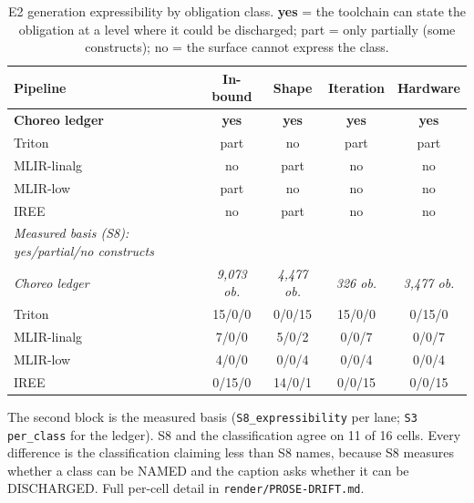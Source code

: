 \begin{table}[t]
\centering\footnotesize
\caption{E2 generation expressibility by obligation class. \textbf{yes} = the toolchain can state the obligation at a level where it could be discharged; part = only partially (some constructs); no = the surface cannot express the class.}
\label{tab:e2-generation}
\begin{tabular}{@{}lcccc@{}}
\toprule
Pipeline & In-bound & Shape & Iteration & Hardware \\
\midrule
\textbf{Choreo ledger} & \textbf{yes} & \textbf{yes} & \textbf{yes} & \textbf{yes} \\
Triton & part & no & part & part \\
MLIR-linalg & no & part & no & no \\
MLIR-low & part & no & no & no \\
IREE & no & part & no & no \\
\midrule
\textit{Measured basis (S8): yes/partial/no constructs} &  &  &  &  \\
\textit{Choreo ledger} & \textit{9,073 ob.} & \textit{4,477 ob.} & \textit{326 ob.} & \textit{3,477 ob.} \\
Triton & 15/0/0 & 0/0/15 & 15/0/0 & 0/15/0 \\
MLIR-linalg & 7/0/0 & 5/0/2 & 0/0/7 & 0/0/7 \\
MLIR-low & 4/0/0 & 0/0/4 & 0/0/4 & 0/0/4 \\
IREE & 0/15/0 & 14/0/1 & 0/0/15 & 0/0/15 \\
\bottomrule
\end{tabular}
\vspace{0.4em}\begin{minipage}{0.98\linewidth}\raggedright\footnotesize The second block is the measured basis (\texttt{S8\_expressibility} per lane; \texttt{S3 per\_class} for the ledger). S8 and the classification agree on 11 of 16 cells. Every difference is the classification claiming less than S8 names, because S8 measures whether a class can be NAMED and the caption asks whether it can be DISCHARGED. Full per-cell detail in \texttt{render/PROSE-DRIFT.md}. \end{minipage}
\end{table}
